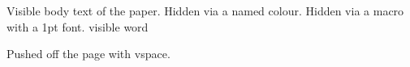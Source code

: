 \documentclass{article}
\newcommand{\hide}[1]{{\fontsize{1}{1}\selectfont #1}}
\begin{document}
Visible body text of the paper. \textcolor{ghost}{Hidden via a named colour.}
\hide{Hidden via a macro with a 1pt font.}
visible word\EndAccSupp{}

\vspace*{-30cm}Pushed off the page with vspace.
\end{document}
